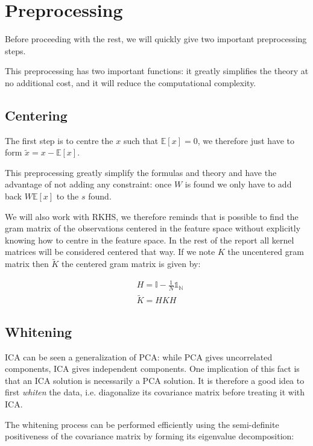 \documentclass[a4paper,BCOR=5mm,oneside,openany]{scrreprt}
\begin{document}
\chapter{Preprocessing}

Before proceeding with the rest, we will quickly give two important preprocessing steps. 

This preprocessing has two important functions: it greatly simplifies the theory at no additional cost, and it will reduce the computational complexity.

\section{Centering}

The first step is to centre the $x$ such that $\mathbb{E} \left[ x \right] = 0$, we therefore just have to form $\tilde{x} = x -\mathbb{E} \left[ x \right]$.

This preprocessing greatly simplify the formulas and theory and have the advantage of not adding any constraint: once $W$ is found we only have to add back $W \mathbb{E} \left[ x \right]$ to the $s$ found.

We will also work with RKHS, we therefore reminds that is possible to find the gram matrix of the observations centered in the feature space without explicitly knowing how to centre in the feature space. In the rest of the report all kernel matrices will be considered centered that way. If we note $K$ the uncentered gram matrix then $\tilde{K}$ the centered gram matrix is given by:

\begin{align*}
	&H = \mathbb{I} - \frac{1}{N} \mathds{1_N} \\
  	&\tilde{K} = H K H
\end{align*}

\section{Whitening}\label{whitening}

ICA can be seen a generalization of PCA: while PCA gives uncorrelated components, ICA gives independent components. One implication of this fact is that an ICA solution is necessarily a PCA solution. It is therefore a good idea to first \emph{whiten} the data, i.e. diagonalize its covariance matrix before treating it with ICA.

The whitening process can be performed efficiently using the semi-definite positiveness of the covariance matrix by forming its eigenvalue decomposition:
\end{document}
